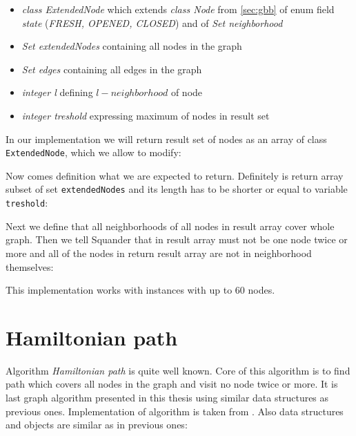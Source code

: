 \documentclass[11pt,twoside,a4paper]{book}
\begin{document}
\begin{itemize}
  \item \textit{class ExtendedNode} which extends \textit{class Node} from
  \ref{sec:gbb} of enum field \textit{state} (\textit{FRESH, OPENED, CLOSED})
  and of \textit{Set neighborhood}
  \item \textit{Set extendedNodes} containing all nodes in the graph
\item \textit{Set edges} containing all edges in the graph
  \item \textit{integer l} defining $l-neighborhood$ of node
  \item \textit{integer treshold} expressing maximum of nodes in result set
\end{itemize}

In our implementation we will return result set of nodes as an array of
class \verb|ExtendedNode|, which we allow to modify:



Now comes definition what we are expected to return. Definitely is return array
subset of set \verb|extendedNodes| and its length has to be shorter or equal to
variable \verb|treshold|:



Next we define that all neighborhoods of all nodes in result array cover
whole graph. Then we tell Squander that in result array must not be one node
twice or more and all of the nodes in return result array are not in
neighborhood themselves:



This implementation works with instances with up to 60 nodes.

\section{Hamiltonian path}
Algorithm \textit{Hamiltonian path} is quite well known. Core of this algorithm
is to find path which covers all nodes in the graph and visit no node twice or
more. It is last graph algorithm presented in this thesis using similar data
structures as previous ones. Implementation of algorithm is taken from
\cite{milicevic:executableSpecificationsForJavaPrograms}. Also data structures
and objects are similar as in previous ones:
\end{document}
